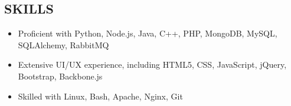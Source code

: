 \documentclass[]{res}
\begin{document}
\address{
3A Software Engineering, University of Waterloo \\
(905) 758-2239 \textbar ~paul.ashbourne@uwaterloo.ca \\
\url{www.github.com/paulashbourne} %
}
\address{110 Orchard Heights Blvd.\\ \hfill Aurora, ON, Canada\\ \hfill L4G 2Z9}
\begin{resume}
 
\section{SKILLS}
\begin{itemize}
  \item Proficient with Python, Node.js, Java, C++, PHP, MongoDB, MySQL, SQLAlchemy, RabbitMQ
  \item Extensive UI/UX experience, including HTML5, CSS, JavaScript, jQuery, Bootstrap, Backbone.js
  \item Skilled with Linux, Bash, Apache, Nginx, Git
\end{itemize}


\end{resume}
\end{document}
